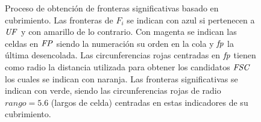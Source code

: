 \begin{figure}[H]

  \caption[Proceso de obtención de fronteras significativas basado en cubrimiento.]{Proceso
    de obtención de fronteras significativas basado en cubrimiento. Las fronteras de $F_i$ se
    indican con azul si pertenecen a $\mathit{UF}$ y con amarillo de lo contrario.
    Con magenta se indican las celdas en $\mathit{FP}$ siendo la numeración su
    orden en la cola y $\mathit{fp}$ la última desencolada. Las
    circunferencias rojas centradas en $\mathit{fp}$ tienen como radio la distancia
    utilizada para obtener los candidatos $\mathit{FSC}$ los cuales se indican con
    naranja. Las fronteras significativas se indican con verde, siendo las
    circunferencias rojas de radio $rango=5.6$ (largos de celda) centradas en estas indicadores de su
  cubrimiento.}\label{fig:ejemploFSCubComp}

\end{figure}
